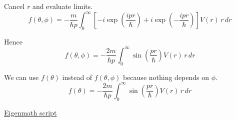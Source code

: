Cancel $r$ and evaluate limits.
\begin{equation*}
f(\theta,\phi)=-\frac{m}{\hbar p}
\int_0^\infty
\left[-i\exp\left(\frac{ipr}{\hbar}\right)+i\exp\left(-\frac{ipr}{\hbar}\right)\right]V(r)\,r\,dr
\end{equation*}

Hence
\begin{equation*}
f(\theta,\phi)=-\frac{2m}{\hbar p}
\int_0^\infty\sin\left(\frac{pr}{\hbar}\right)V(r)\,r\,dr
\end{equation*}

We can use $f(\theta)$ instead of $f(\theta,\phi)$ because nothing depends on $\phi$.
\begin{equation*}
f(\theta)=-\frac{2m}{\hbar p}
\int_0^\infty\sin\left(\frac{pr}{\hbar}\right)V(r)\,r\,dr
\end{equation*}

\href{https://georgeweigt.github.io/examples/scattering-part-2-demo.html}{Eigenmath script}


